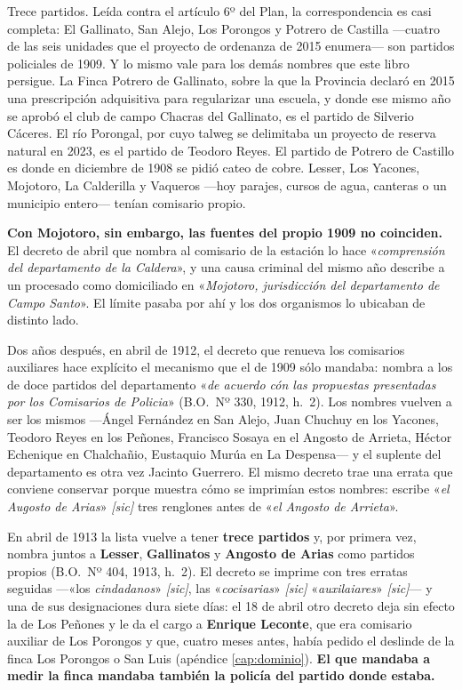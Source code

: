 Trece partidos. Leída contra el artículo 6º del Plan, la correspondencia es casi completa:
El Gallinato, San Alejo, Los Porongos y Potrero de Castilla —cuatro de las seis unidades
que el proyecto de ordenanza de 2015 enumera— son partidos policiales de 1909. Y lo mismo vale para los
demás nombres que este libro persigue. La Finca Potrero de Gallinato, sobre la que la
Provincia declaró en 2015 una prescripción adquisitiva para regularizar una escuela, y
donde ese mismo año se aprobó el club de campo Chacras del Gallinato, es el partido de
Silverio Cáceres. El río Porongal, por cuyo talweg se delimitaba un proyecto de reserva
natural en 2023, es el partido de Teodoro Reyes. El partido de Potrero de Castillo es donde
en diciembre de 1908 se pidió cateo de cobre. Lesser, Los Yacones, Mojotoro, La Calderilla
y Vaqueros —hoy parajes, cursos de agua, canteras o un municipio entero— tenían comisario
propio.

\textbf{Con Mojotoro, sin embargo, las fuentes del propio 1909 no coinciden.} El decreto de abril
que nombra al comisario de la estación lo hace «\textit{comprensión del departamento de la
Caldera}», y una causa criminal del mismo año describe a un procesado como domiciliado en
«\textit{Mojotoro, jurisdicción del departamento de Campo Santo}». El límite pasaba por ahí y los
dos organismos lo ubicaban de distinto lado.

Dos años después, en abril de 1912, el decreto que renueva los comisarios auxiliares hace
explícito el mecanismo que el de 1909 sólo mandaba: nombra a los de doce partidos del
departamento «\textit{de acuerdo cón las propuestas presentadas por los Comisarios de Policia}»
(B.O.\ Nº 330, 1912, h.\ 2). Los nombres vuelven a ser los mismos ---Ángel
Fernández en San Alejo, Juan Chuchuy en los
Yacones, Teodoro Reyes en los Peñones, Francisco Sosaya en el Angosto de Arrieta, Héctor
Echenique en Chalchañio, Eustaquio Murúa en La Despensa--- y el suplente
del departamento es otra vez Jacinto Guerrero. El mismo decreto trae
una errata que conviene conservar porque muestra cómo se imprimían estos nombres: escribe
«\textit{el Augosto de Arias}» \textit{[sic]} tres renglones antes de «\textit{el Angosto de
Arrieta}».

En abril de 1913 la lista vuelve a tener \textbf{trece partidos} y, por primera vez, nombra
juntos a \textbf{Lesser}, \textbf{Gallinatos} y \textbf{Angosto de Arias} como partidos propios
(B.O.\ Nº 404, 1913, h.\ 2). El decreto se imprime con tres erratas seguidas ---«los
\textit{cindadanos}» \textit{[sic]}, las «\textit{cocisarias}» \textit{[sic]}
«\textit{auxilaiares}» \textit{[sic]}--- y una de sus designaciones dura siete días: el 18 de
abril otro decreto deja sin efecto la de Los Peñones y le da el cargo a \textbf{Enrique
Leconte}, que era comisario auxiliar de Los Porongos y que, cuatro meses
antes, había pedido el deslinde de la finca Los Porongos o San Luis (apéndice
\ref{cap:dominio}). \textbf{El que mandaba a medir la finca mandaba también la policía del
partido donde estaba.}

